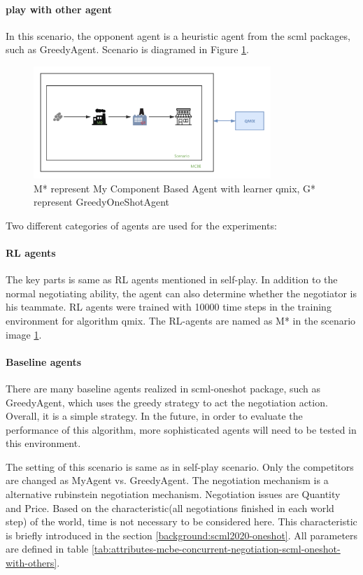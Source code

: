 \paragraph{play with other agent} In this scenario, the opponent agent is a heuristic agent from the scml packages, such as GreedyAgent.
Scenario is diagramed in Figure \ref{fig:scenario-oneshot-scml-play-with-greedy}.
\begin{figure}[htbp]
\centering
\includegraphics[width=0.80\textwidth]{./images/scenario-oneshot-scml-play-with-greedy.png}
\caption{M* represent My Component Based Agent with learner \gls{qmix}, G* represent GreedyOneShotAgent}
\label{fig:scenario-oneshot-scml-play-with-greedy}
\end{figure}

Two different categories of agents are used for the experiments:

\paragraph{RL agents} The key parts is same as RL agents mentioned in self-play. In addition to the normal negotiating ability, the agent can also determine whether the negotiator is his teammate. RL agents were trained with 10000 time steps in the training environment for algorithm qmix. The RL-agents are named as M* in the scenario image \ref{fig:scenario-oneshot-scml-play-with-greedy}.
\paragraph{Baseline agents} There are many baseline agents realized in scml-oneshot package, such as GreedyAgent, which uses the greedy strategy to act the negotiation action. Overall, it is a simple strategy. In the future, in order to evaluate the performance of this algorithm, more sophisticated agents will need to be tested in this environment. 

The setting of this scenario is same as in self-play scenario. Only the competitors are changed as MyAgent vs. GreedyAgent. The negotiation mechanism is a alternative rubinstein negotiation mechanism. Negotiation issues are Quantity and Price. Based on the characteristic(all negotiations finished in each world step) of the world, time is not necessary to be considered here. This characteristic is briefly introduced in the section \ref{background:scml2020-oneshot}. 
All parameters are defined in table \ref{tab:attributes-mcbe-concurrent-negotiation-scml-oneshot-with-others}.

